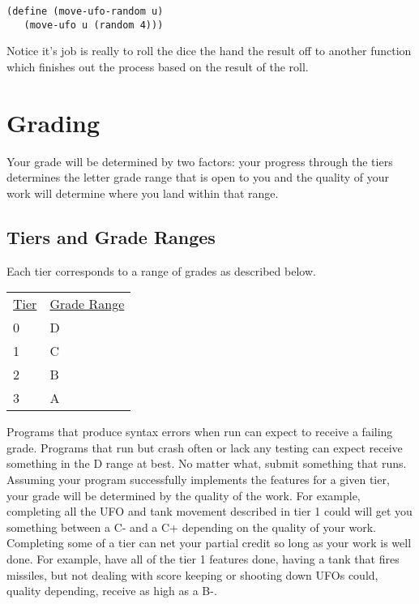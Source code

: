 \documentclass[nobib]{tufte-handout}
\begin{document}
\begin{lstlisting}
(define (move-ufo-random u)
   (move-ufo u (random 4)))
\end{lstlisting}

Notice it's job is really to roll the dice the hand the result off to another function which finishes out the process based on the result of the roll. 





\section*{Grading}

Your grade will be determined by two factors: your progress through the tiers determines the letter grade range that is open to you and the quality of your work will determine where you land within that range.

\subsection*{Tiers and Grade Ranges}

Each tier corresponds to a range of grades as described below.

\begin{tabular}{ll}
\underline{Tier} & \underline{Grade Range} \\
 0 & D \\
 1 & C \\
 2 & B \\
 3 & A \\
\end{tabular}

 Programs that produce syntax errors when run can expect to receive a failing grade. Programs that run but crash often or lack any testing can expect receive something in the D range at best. No matter what, submit something that runs. Assuming your program successfully implements the features for a given tier, your grade will be determined by the quality of the work. For example, completing all the UFO and tank movement described in tier 1 could will get you something between a C- and a C+ depending on the quality of your work. Completing some of a tier can net your partial credit so long as your work is well done. For example, have all of the tier 1 features done, having a tank that fires missiles, but not dealing with score keeping or shooting down UFOs could, quality depending, receive as high as a B-.
\end{document}
